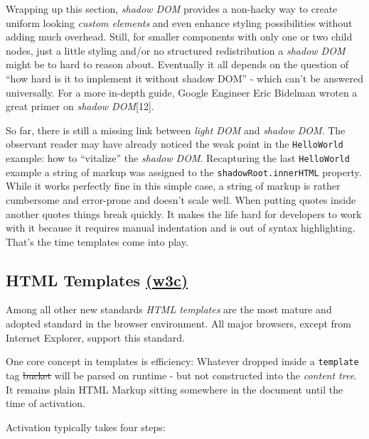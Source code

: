 \documentclass[]{assets/latex/ieee}
\begin{document}
Wrapping up this section, \emph{shadow DOM} provides a non-hacky way to
create uniform looking \emph{custom elements} and even enhance styling
possibilities without adding much overhead. Still, for smaller
components with only one or two child nodes, just a little styling
and/or no structured redistribution a \emph{shadow DOM} might be to hard
to reason about. Eventually it all depends on the question of ``how hard
is it to implement it without shadow DOM'' - which can't be answered
universally. For a more in-depth guide, Google Engineer Eric Bidelman
wroten a great primer on \emph{shadow DOM}{[}12{]}.

So far, there is still a missing link between \emph{light DOM} and
\emph{shadow DOM}. The observant reader may have already noticed the
weak point in the \texttt{HelloWorld} example: how to ``vitalize'' the
\emph{shadow DOM}. Recapturing the last \texttt{HelloWorld} example a
string of markup was assigned to the \texttt{shadowRoot.innerHTML}
property. While it works perfectly fine in this simple case, a string of
markup is rather cumbersome and error-prone and doesn't scale well. When
putting quotes inside another quotes things break quickly. It makes the
life hard for developers to work with it because it requires manual
indentation and is out of syntax highlighting. That's the time templates
come into play.

\subsection{\texorpdfstring{HTML Templates
\href{https://www.w3.org/TR/html5/scripting-1.html\#the-template-element}{(w3c)}}{HTML Templates (w3c)}}\label{html-templates-w3c}

Among all other new standards \emph{HTML templates} are the most mature
and adopted standard in the browser environment. All major browsers,
except from Internet Explorer, support this standard.

One core concept in templates is efficiency: Whatever dropped inside a
\texttt{template} tag \sout{bucket} will be parsed on runtime - but not
constructed into the \emph{content tree}. It remains plain HTML Markup
sitting somewhere in the document until the time of activation.

Activation typically takes four steps:
\end{document}
